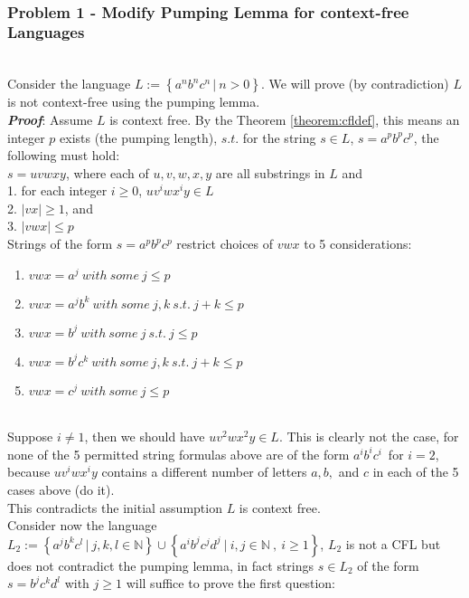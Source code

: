 \documentclass{article}
\theoremstyle{mydef}
\theoremstyle{mythm}
\theoremstyle{mylemming}
\theoremstyle{myq}
\begin{document}
{}



\\
\subsubsection{Problem 1 - Modify Pumping Lemma for context-free Languages}
\thmpl
\vspace{10}
\\
Consider the language $L:=\left\{ a^{n}b^{n}c^{n\  }|\  n>0\right\}  $. We will prove (by contradiction) $L$ is not context-free using the pumping lemma. 
\\\textbf{\textit{Proof}}:
 Assume $L$ is context free. By the Theorem \ref{theorem:cfldef}, this means an integer $p$ exists (the pumping length), $s.t.$ for the string $s \in L$, $s=a^{p}b^{p}c^{p}$, the following must hold:
\\
$s=uvwxy$, where each of $u,v,w,x,y$ are all substrings in $L$ and
\\
1. for each integer $i \geq 0$, $uv^{i}wx^{i}y\in L$
\\
2. $|vx| \geq 1$, and 
\\
3. $|vwx| \leq p$
\\
Strings of the form $s=a^{p}b^{p}c^{p}$ restrict choices of $vwx$ to 5 considerations:
\\
\begin{enumerate}
    \item $vwx=a^{j}\  with\  some\  j\leq p$
    \item $vwx=a^{j}b^{k}\  with\  some\  j,k\  s.t.\  j+k\leq p$
    \item $vwx=b^{j}\  with\  some\  j\  s.t.\  j\leq p$
    \item $vwx=b^{j}c^{k}\  with\  some\  j,k\  s.t.\  j+k\leq p$
    \item $vwx=c^{j}\  with\  some\  j\leq p$
\end{enumerate}
\\
Suppose $i \neq 1$, then we should have $uv^{2}wx^{2}y \in L$. This is clearly not the case, for none of the 5 permitted string formulas above are of the form $a^{i}b^{i}c^{i\  }$ for $i=2$, because $uv^{i}wx^{i}y$ contains a different number of letters $a,b,$ and $c$ in each of the 5 cases above (do it). 
\\
This contradicts the initial assumption $L$ is context free.
\\
Consider now the language $L_{2}:=\left\{ a^{j}b^{k}c^{l\  }|\  j,k,l\in \mathbb{N} \right\}  \cup \left\{ a^{i}b^{j}c^{j}d^{j}\  |\  i,j\in \mathbb{N} \  ,\  i\geq 1\right\}  $, $L_{2}$ is not a CFL but does not contradict the pumping lemma, in fact strings $s \in L_{2}$ of the form $s=b^{j}c^{k}d^{l} $ with $j \geq 1$ will suffice to prove the first question:
\end{document}
